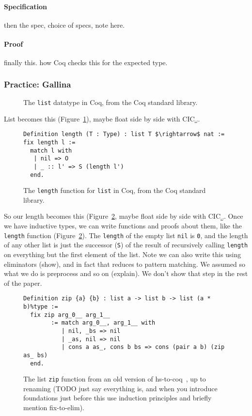 \paragraph{Specification}
then the spec, choice of specs, note here.

\paragraph{Proof}
finally this.
how Coq checks this for the expected type.

\subsubsection{Practice: Gallina}

\begin{figure}
   
\caption{The \lstinline{list} datatype in Coq, from the Coq standard library.}
\label{fig:list}
\end{figure}

List becomes this (Figure~\ref{fig:list}), maybe float side by side with CIC$_{\omega}$.

\begin{figure}
\begin{lstlisting}
Definition length (T : Type) : list T $\rightarrow$ nat := fix length l :=
  match l with
   | nil => O
   | _ :: l' => S (length l')
  end.
\end{lstlisting}
\caption{The \lstinline{length} function for \lstinline{list} in Coq, from the Coq standard library.}
\label{fig:length}
\end{figure}

So our length becomes this (Figure~\ref{fig:length}, maybe float side by side with CIC$_{\omega}$.
Once we have inductive types, we can write functions and proofs about them, like the \lstinline{length} function (Figure~\ref{fig:length}).
The \lstinline{length} of the empty list \lstinline{nil} is \lstinline{0}, and the length of any other list
is just the successor (\lstinline{S}) of the result of recursively calling \lstinline{length} on everything but the first element of the list.
Note we can also write this using eliminators (show), and in fact that reduces to pattern matching.
We assumed  so what we do is preprocess and so on (explain).
We don't show that step in the rest of the paper.

\begin{figure}
\begin{lstlisting}
Definition zip {a} {b} : list a -> list b -> list (a * b)%type :=
  fix zip arg_0__ arg_1__
        := match arg_0__, arg_1__ with
           | nil, _bs => nil
           | _as, nil => nil
           | cons a as_, cons b bs => cons (pair a b) (zip as_ bs)
  end.
\end{lstlisting}
\caption{The list \lstinline{zip} function from an old version of hs-to-coq~\cite{TODO}, up to renaming (TODO just say everything is, and when you introduce foundations just before this use induction principles and briefly mention fix-to-elim).}
\label{fig:zip}
\end{figure}

